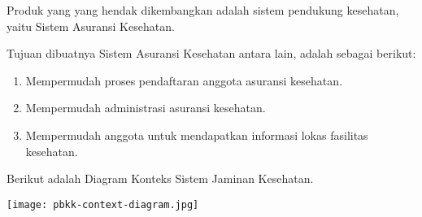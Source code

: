 Produk yang yang hendak dikembangkan adalah sistem pendukung kesehatan, yaitu Sistem Asuransi Kesehatan.\par
		{Tujuan dibuatnya Sistem Asuransi Kesehatan antara lain, adalah sebagai berikut:
		\begin{enumerate}
			\item Mempermudah proses pendaftaran anggota asuransi kesehatan.
			\item Mempermudah administrasi asuransi kesehatan.
			\item Mempermudah anggota untuk mendapatkan informasi lokas fasilitas kesehatan.
		\end{enumerate}}
		\par
Berikut adalah Diagram Konteks Sistem Jaminan Kesehatan.\\
\begin{center}
	\texttt{[image: pbkk-context-diagram.jpg]}
\end{center}